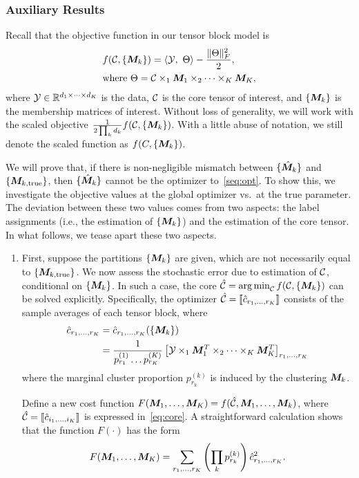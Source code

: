 \documentclass{article}
\begin{document}
\begin{appendices}
\subsubsection{Auxiliary Results}

Recall that the objective function in our tensor block model is 
\begin{align}\label{seq:opt}
&f(\mathcal{C}, \{ \bm M_k\})=\langle \mathcal{Y},\ \Theta\rangle -\frac{\lVert\Theta\rVert_F^2}{2},\\
&\text{where } \Theta=\mathcal{C}\times_1\bm M_1\times_2\cdots\times_K \bm M_K,
\end{align}
where $\mathcal{Y}\in\mathbb{R}^{d_1\times \cdots \times d_K}$ is the data, $\mathcal{C}$ is the core tensor of interest, and $\{\bm M_k\}$ is the membership matrices of interest. Without loss of generality, we will work with the scaled objective ${1\over 2\prod_k d_k}f(\mathcal{C}, \{\bm M_k\})$. With a little abuse of notation, we still denote the scaled function as $f(C,\{\bm M_k\})$.

We will prove that, if there is non-negligible mismatch between $\{\hat {\bm M}_k\}$ and $\{\bm M_{k,\text{true}}\}$, then $\{\hat {\bm M}_k\}$ cannot be the optimizer to~\eqref{seq:opt}. To show this, we investigate the objective values at the global optimizer vs.\ at the true parameter. The deviation between these two values comes from two aspects: the label assignments (i.e., the estimation of $\{\bm M_k\}$) and the estimation of the core tensor. In what follows, we tease apart these two aspects.
 
 \begin{enumerate}
\item First, suppose the partitions $\{\bm M_k\}$ are given, which are not necessarily equal to $\{\bm M_{k,\text{true}}\}$. We now assess the stochastic error due to estimation of $\mathcal{C}$, conditional on $\{\bm M_k\}$. In such a case, the core $\hat {\mathcal{C}} = \operatorname*{arg\,min}_{\mathcal{C}} f(\mathcal{C},\{\bm M_k\})$ can be solved explicitly. Specifically, the optimizer $\hat {\mathcal{C}}=\llbracket \hat c_{r_1,\ldots,r_K} \rrbracket$ consists of the sample averages of each tensor block, where
\begin{align}\label{eq:core}
\displaystyle \hat c_{r_1,\ldots,r_K}&=\hat c_{r_1,\ldots,r_K}(\{\bm M_k\})\\
&= \frac{1}{p_{r_1}^{(1)}\ldots p_{r_K}^{(K)}}\left[\mathcal{Y}\times_1\bm M^T_1\times_2\cdots\times_K \bm M^T_K\right]_{r_1,\ldots,r_K}
\end{align}
where the marginal cluster proportion $p^{(k)}_{r_k}$ is induced by the clustering $\bm M_k$. 

Define a new cost function $F(\bm M_1,\ldots,\bm M_K)= f(\hat {\mathcal{C}}, \bm M_1,\ldots,\bm M_k)$, where $\hat {\mathcal{C}}=\llbracket \hat c_{i_1,\ldots,i_K} \rrbracket$ is expressed in~\eqref{eq:core}. A straightforward calculation shows that the function $F(\cdot)$ has the form
\begin{equation}\label{eq:F}
F(\bm M_1,\ldots,\bm M_K) = \sum_{r_1,\ldots,r_K}\left(\prod_k p^{(k)}_{r_k}\right) \hat c_{r_1,\ldots,r_K}^2.
\end{equation}



\end{enumerate}
\end{appendices}
\end{document}
